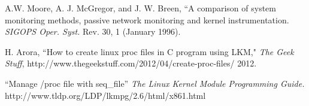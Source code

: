 \documentclass[conference]{IEEEtran}
\begin{document}
\def\handb{ \it Handbook of Intelligent Control: Neural\rm , \it
    Fuzzy\rm , \it and Adaptive Approaches \rm }

\begin{thebibliography}{1}
 A.W. Moore, A. J. McGregor, and J. W. Breen,
        ``A comparison of system monitoring methods, passive network monitoring and kernel instrumentation.
        {\it SIGOPS Oper. Syst.} Rev. 30, 1 (January 1996).

 H. Arora, ``How to create linux proc files in C program using LKM,"
        {\it The Geek Stuff}, http://www.thegeekstuff.com/2012/04/create-proc-files/ 2012.

 ``Manage /proc file with seq\_file''
	{\it The Linux Kernel Module Programming Guide.}
        http://www.tldp.org/LDP/lkmpg/2.6/html/x861.html

\end{thebibliography}

\end{document}
